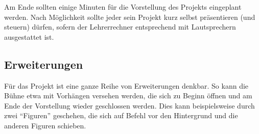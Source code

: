 Am Ende sollten einige Minuten für die Vorstellung des Projekts
eingeplant werden. Nach Möglichkeit sollte jeder sein Projekt kurz
selbst präsentieren (und steuern) dürfen, sofern der Lehrerrechner
entsprechend mit Lautsprechern ausgestattet ist.

\subsection{Erweiterungen}\label{erweiterungen}

Für das Projekt ist eine ganze Reihe von Erweiterungen denkbar. So kann
die Bühne etwa mit Vorhängen versehen werden, die sich zu Beginn öffnen
und am Ende der Vorstellung wieder geschlossen werden. Dies kann
beispielsweise durch zwei ``Figuren'' geschehen, die sich auf Befehl vor
den Hintergrund und die anderen Figuren schieben.
